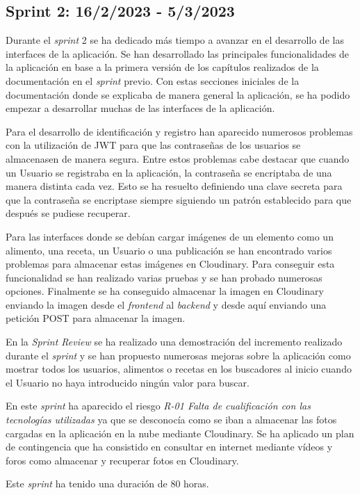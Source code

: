 \subsection{Sprint 2: 16/2/2023 - 5/3/2023}
Durante el \textit{sprint} 2 se ha dedicado más tiempo a avanzar en el desarrollo de las interfaces de la aplicación. Se han desarrollado las principales funcionalidades de la aplicación en base a la primera versión de los capítulos realizados de la documentación en el \textit{sprint} previo. Con estas secciones iniciales de la documentación donde se explicaba de manera general la aplicación, se ha podido empezar a desarrollar muchas de las interfaces de la aplicación.

Para el desarrollo de identificación y registro han aparecido numerosos problemas con la utilización de JWT para que las contraseñas de los usuarios se almacenasen de manera segura. Entre estos problemas cabe destacar que cuando un Usuario se registraba en la aplicación, la contraseña se encriptaba de una manera distinta cada vez. Esto se ha resuelto definiendo una clave secreta para que la contraseña se encriptase siempre siguiendo un patrón establecido para que después se pudiese recuperar. 

Para las interfaces donde se debían cargar imágenes de un elemento como un alimento, una receta, un Usuario o una publicación se han encontrado varios problemas para almacenar estas imágenes en Cloudinary. Para conseguir esta funcionalidad se han realizado varias pruebas y se han probado numerosas opciones. Finalmente se ha conseguido almacenar la imagen en Cloudinary enviando la imagen desde el \textit{frontend} al \textit{backend} y desde aquí enviando una petición POST para almacenar la imagen.

En la \textit{Sprint Review} se ha realizado una demostración del incremento realizado durante el \textit{sprint} y se han propuesto numerosas mejoras sobre la aplicación como mostrar todos los usuarios, alimentos o recetas en los buscadores al inicio cuando el Usuario no haya introducido ningún valor para buscar. 

En este \textit{sprint} ha aparecido el riesgo \textit{R-01 Falta de cualificación con las tecnologías utilizadas} ya que se desconocía como se iban a almacenar las fotos cargadas en la aplicación en la nube mediante Cloudinary. Se ha aplicado un plan de contingencia que ha consistido en consultar en internet mediante vídeos y foros como almacenar y recuperar fotos en Cloudinary.

Este \textit{sprint} ha tenido una duración de 80 horas.

